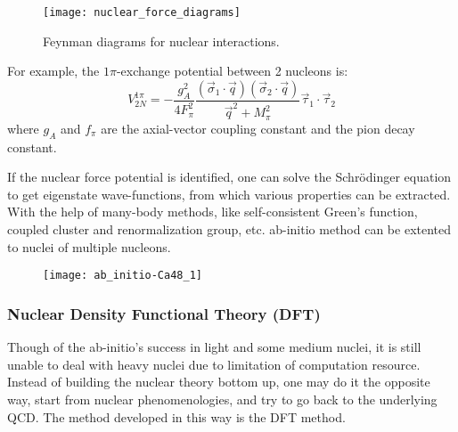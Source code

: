 \begin{figure}
    \centering
    \texttt{[image: nuclear\_force\_diagrams]}
    \caption{Feynman diagrams for nuclear interactions.}
\end{figure}

For example, the $1\pi$-exchange potential between 2 nucleons is:
\begin{equation}
    V_{2N}^{1\pi} = -\frac{g_A^2}{4F_\pi^2}
    \frac{(\vec{\sigma}_1\cdot\vec{q})(\vec{\sigma}_2\cdot\vec{q})}{\vec{q}^2 + M^2_\pi}
    \vec{\tau}_1\cdot\vec{\tau}_2 
\end{equation}
where $g_A$ and $f_\pi$ are the axial-vector coupling constant and the pion 
decay constant.

If the nuclear force potential is identified, one can solve the Schr\"{o}dinger 
equation to get eigenstate wave-functions, from which various properties can be extracted. 
With the help of many-body methods, like self-consistent Green's function,
coupled cluster and renormalization group, etc. ab-initio method can be extented
to nuclei of multiple nucleons.

\begin{figure}
    \centering
    \texttt{[image: ab\_initio-Ca48\_1]}
\end{figure}

\begin{comment}
Deviation of ab-initio result and observation for heavy nuclei indicates the 
importance of higher-order interactions.

\begin{equation}
    \CL_{eff} = \CL_{\pi\pi} + \CL_{\pi N} + \CL_{NN} + \cdots
\end{equation}

3-neutron forces are hard to observe directly, they increase the pressure of
neutron matter and therefore the neutron skin thickness of both \Pb and \Ca.

3-nucleon force term
\begin{itemize}
    \item Long-range two-pion exchange
    \item Medium-range one-pion exchange
    \item Short range three-nucleon contact
\end{itemize}
\end{comment}
\subsubsection{Nuclear Density Functional Theory (DFT)}
Though of the ab-initio's success in light and some medium nuclei, it is still 
unable to deal with heavy nuclei due to limitation of computation resource.
Instead of building the nuclear theory bottom up, one may do it the opposite
way, start from nuclear phenomenologies, and try to go back to the underlying
QCD. The method developed in this way is the DFT method.

